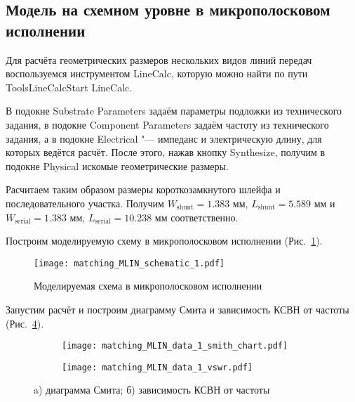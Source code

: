 \subsection{Модель на схемном уровне в микрополосковом исполнении}

Для расчёта геометрических размеров нескольких видов линий передач воспользуемся инструментом LineCalc, которую можно найти по пути Tools\textrightarrow LineCalc\textrightarrow Start LineCalc.

В подокне Substrate Parameters задаём параметры подложки из технического задания, в подокне Component Parameters задаём частоту из технического задания, а в подокне Electrical "--- импеданс и электрическую длину, для которых ведётся расчёт.
После этого, нажав кнопку Synthesize, получим в подокне Physical искомые геометрические размеры.

Расчитаем таким образом размеры короткозамкнутого шлейфа и последовательного участка.
Получим $W_\text{shunt} = 1.383 \text{~мм}$, $L_\text{shunt} = 5.589 \text{~мм}$ и $W_\text{serial} = 1.383 \text{~мм}$, $L_\text{serial} = 10.238 \text{~мм}$ соответственно.

Построим моделируемую схему в микрополосковом исполнении (Рис.~\ref{fig:matching_MLIN_schematic_1}).

\begin{figure}[!ht]
    \centering
    \texttt{[image: matching\_MLIN\_schematic\_1.pdf]}
    \caption{Моделируемая схема в микрополосковом исполнении}%
    \label{fig:matching_MLIN_schematic_1}
\end{figure}

Запустим расчёт и построим диаграмму Смита и зависимость КСВН от частоты (Рис.~\ref{fig:matching_MLIN_data_display_1}).

\begin{figure}[!ht]
    \begin{subfigure}[b]{0.45\textwidth}
        \centering
        \texttt{[image: matching\_MLIN\_data\_1\_smith\_chart.pdf]}
        \caption{}%
    \label{fig:matching_MLIN_data_1_smith_chart}
    \end{subfigure}
    \hfill
    \begin{subfigure}[b]{0.45\textwidth}
        \centering
        \texttt{[image: matching\_MLIN\_data\_1\_vswr.pdf]}
        \caption{}%
    \label{fig:matching_MLIN_data_1_vswr}
    \end{subfigure}
    \caption{
        a) диаграмма Смита;
        б) зависимость КСВН от частоты
    }%
    \label{fig:matching_MLIN_data_display_1}
\end{figure}

